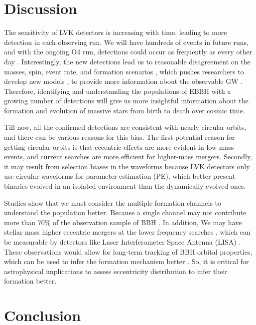 \documentclass[twocolumn,prd,nofootinbib]{revtex4}
\begin{document}
\section{Discussion}\label{sec:discussion}
The sensitivity of LVK detectors is increasing with time, leading to more detection in each observing run. 
We will have hundreds of events in future runs, and with the ongoing O4 run, detections could occur as 
frequently as every other day \cite{detection_rate_2016,detection_rate_2015}. 
Interestingly, the new detections lead us to reasonable disagreement on the masses, spin, event rate, and 
formation scenarios \cite{LSC-BBH-2016, LSC-GW150914-2016}, which pushes researchers to develop new models 
\cite{Mandel-2016,marchant-2016}, to provide more information about the observable GW 
\cite{Barausse-2018, Abbot-2016-schotastic,dvorkin-2016}. Therefore, identifying and understanding the 
populations of EBBH with a growing number of detections will give us more insightful information about the 
formation and evolution of massive stars from birth to death over cosmic time.

Till now, all the confirmed detections are consistent with nearly circular orbits, and there can be various 
reasons for this bias. The first potential reason for getting circular orbits is that eccentric effects are 
more evident in low-mass events, and current searches are more efficient for higher-mass mergers. Secondly, 
it may result from selection biases in the waveforms because LVK detectors only use circular waveforms for 
parameter estimation (PE), which better present binaries evolved in an isolated environment than the 
dynamically evolved ones. 

Studies show that we must consider the multiple formation channels to understand the population better. Because 
a single channel may not contribute more than $70\%$ of the observation sample of BBH \cite{zevin-2021}. In 
addition, We may have stellar mass higher eccentric mergers at the lower frequency searches 
\cite{sesana-2016,chen-2017}, which can be measurable by detectors like Laser Interferometer Space Antenna 
(LISA) \cite{LISA-2017}. These observations would allow for long-term tracking of BBH orbital properties, 
which can be used to infer the formation mechanism better \cite{Breivik-2016}. So, it is critical for 
astrophysical implications to assess eccentricity distribution to infer their formation better.

\section{Conclusion}
\label{sec:conclude}
\end{document}
